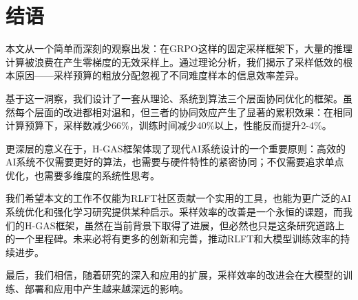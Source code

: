 \section{结语}
\label{sec:closing}

本文从一个简单而深刻的观察出发：在GRPO这样的固定采样框架下，大量的推理计算被浪费在产生零梯度的无效采样上。通过理论分析，我们揭示了采样低效的根本原因——采样预算的粗放分配忽视了不同难度样本的信息效率差异。

基于这一洞察，我们设计了一套从理论、系统到算法三个层面协同优化的框架。虽然每个层面的改进都相对温和，但三者的协同效应产生了显著的累积效果：在相同计算预算下，采样数减少66\%，训练时间减少40\%以上，性能反而提升2-4\%。

更深层的意义在于，H-GAS框架体现了现代AI系统设计的一个重要原则：高效的AI系统不仅需要更好的算法，也需要与硬件特性的紧密协同；不仅需要追求单点优化，也需要多维度的系统性思考。

我们希望本文的工作不仅能为RLFT社区贡献一个实用的工具，也能为更广泛的AI系统优化和强化学习研究提供某种启示。采样效率的改善是一个永恒的课题，而我们的H-GAS框架，虽然在当前背景下取得了进展，但必然也只是这条研究道路上的一个里程碑。未来必将有更多的创新和完善，推动RLFT和大模型训练效率的持续进步。

最后，我们相信，随着研究的深入和应用的扩展，采样效率的改进会在大模型的训练、部署和应用中产生越来越深远的影响。
